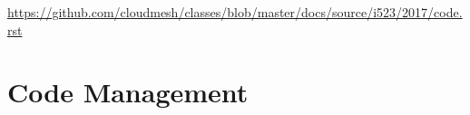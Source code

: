\begin{fileremark}\url{https://github.com/cloudmesh/classes/blob/master/docs/source/i523/2017/code.rst}\end{fileremark}
\section{Code Management}\label{code-management}

